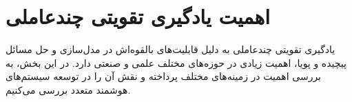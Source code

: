 \section{اهمیت یادگیری تقویتی چندعاملی}

یادگیری تقویتی چندعاملی به دلیل قابلیت‌های بالقوه‌اش در مدل‌سازی و حل مسائل پیچیده و پویا، اهمیت زیادی در حوزه‌های مختلف علمی و صنعتی دارد. در این بخش، به بررسی اهمیت  در زمینه‌های مختلف پرداخته و نقش آن را در توسعه سیستم‌های هوشمند متعدد بررسی می‌کنیم.



